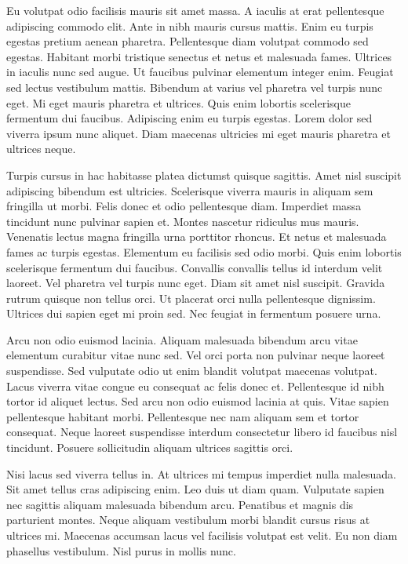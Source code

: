 Eu volutpat odio facilisis mauris sit amet massa. A iaculis at erat pellentesque adipiscing commodo elit. Ante in nibh mauris cursus mattis. Enim eu turpis egestas pretium aenean pharetra. Pellentesque diam volutpat commodo sed egestas. Habitant morbi tristique senectus et netus et malesuada fames. Ultrices in iaculis nunc sed augue. Ut faucibus pulvinar elementum integer enim. Feugiat sed lectus vestibulum mattis. Bibendum at varius vel pharetra vel turpis nunc eget. Mi eget mauris pharetra et ultrices. Quis enim lobortis scelerisque fermentum dui faucibus. Adipiscing enim eu turpis egestas. Lorem dolor sed viverra ipsum nunc aliquet. Diam maecenas ultricies mi eget mauris pharetra et ultrices neque.

Turpis cursus in hac habitasse platea dictumst quisque sagittis. Amet nisl suscipit adipiscing bibendum est ultricies. Scelerisque viverra mauris in aliquam sem fringilla ut morbi. Felis donec et odio pellentesque diam. Imperdiet massa tincidunt nunc pulvinar sapien et. Montes nascetur ridiculus mus mauris. Venenatis lectus magna fringilla urna porttitor rhoncus. Et netus et malesuada fames ac turpis egestas. Elementum eu facilisis sed odio morbi. Quis enim lobortis scelerisque fermentum dui faucibus. Convallis convallis tellus id interdum velit laoreet. Vel pharetra vel turpis nunc eget. Diam sit amet nisl suscipit. Gravida rutrum quisque non tellus orci. Ut placerat orci nulla pellentesque dignissim. Ultrices dui sapien eget mi proin sed. Nec feugiat in fermentum posuere urna.

Arcu non odio euismod lacinia. Aliquam malesuada bibendum arcu vitae elementum curabitur vitae nunc sed. Vel orci porta non pulvinar neque laoreet suspendisse. Sed vulputate odio ut enim blandit volutpat maecenas volutpat. Lacus viverra vitae congue eu consequat ac felis donec et. Pellentesque id nibh tortor id aliquet lectus. Sed arcu non odio euismod lacinia at quis. Vitae sapien pellentesque habitant morbi. Pellentesque nec nam aliquam sem et tortor consequat. Neque laoreet suspendisse interdum consectetur libero id faucibus nisl tincidunt. Posuere sollicitudin aliquam ultrices sagittis orci.

Nisi lacus sed viverra tellus in. At ultrices mi tempus imperdiet nulla malesuada. Sit amet tellus cras adipiscing enim. Leo duis ut diam quam. Vulputate sapien nec sagittis aliquam malesuada bibendum arcu. Penatibus et magnis dis parturient montes. Neque aliquam vestibulum morbi blandit cursus risus at ultrices mi. Maecenas accumsan lacus vel facilisis volutpat est velit. Eu non diam phasellus vestibulum. Nisl purus in mollis nunc.

